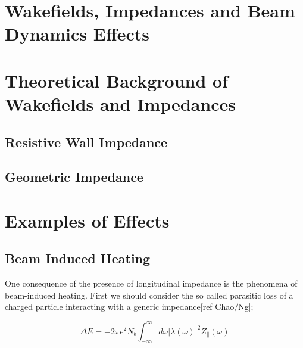\section{Wakefields, Impedances and Beam Dynamics Effects}

\section{Theoretical Background of Wakefields and Impedances}

%
%
% 
%
%
%
%
%
%
%
%
%
%

\subsection{Resistive Wall Impedance}

\subsection{Geometric Impedance}

\section{Examples of Effects}

\subsection{Beam Induced Heating}

One consequence of the presence of longitudinal impedance is the phenomena of beam-induced heating. First we should consider the so called parasitic loss of a charged particle interacting with a generic impedance[ref Chao/Ng];

\begin{equation}
\Delta E = -2\pi e^{2}N_{b}\int^{\infty}_{-\infty} d\omega \left| \lambda \left( \omega \right)  \right|^{2} Z_{\parallel} \left( \omega \right)
\end{equation}

